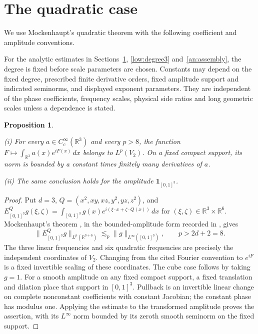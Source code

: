 \documentclass[11pt]{amsart}
\newtheorem{proposition}[theorem]{Proposition}
\theoremstyle{definition}
\theoremstyle{remark}
\newcommand{\R}{\mathbb R}
\numberwithin{equation}{section}
\begin{document}
\section{The quadratic case}\label{root:quadratic}

We use Mockenhaupt's quadratic theorem \cite{Moc96} with the following coefficient and amplitude conventions.

For the analytic estimates in Sections~\ref{root:quadratic}, \ref{low:degree3} and~\ref{an:assembly}, the degree is fixed before scale parameters are chosen. Constants may depend on the fixed degree, prescribed finite derivative orders, fixed amplitude support and indicated seminorms, and displayed exponent parameters. They are independent of the phase coefficients, frequency scales, physical side ratios and long geometric scales unless a dependence is stated.

\begin{proposition}\label{root:quadratic-upper}

\noindent\textup{(i)} For every $a\in C_c^\infty(\R^3)$ and every $p>8$, the function $F\mapsto\int_{\R^3}a(x)e^{iF(x)}\,dx$ belongs to $L^p(V_2)$. On a fixed compact support, its norm is bounded by a constant times finitely many derivatives of $a$.

\noindent\textup{(ii)} The same conclusion holds for the amplitude $\mathbf1_{[0,1]^3}$.
\end{proposition}

\begin{proof}
Put $d=3$, $Q=(x^2,xy,xz,y^2,yz,z^2)$, and $E^Q_{[0,1]^3}g(\xi,\zeta)=\int_{[0,1]^3}g(x)e^{i(\xi\cdot x+\zeta\cdot Q(x))}\,dx$ for $(\xi,\zeta)\in\R^3\times\R^6$. Mockenhaupt's theorem \cite{Moc96}, in the bounded-amplitude form recorded in \cite[Section 1.3]{BGZZK}, gives
\[
\|E^Q_{[0,1]^3}g\|_{L^p(\mathbb R^{3+6})}\lesssim_p \|g\|_{L^\infty([0,1]^3)},\qquad p>2d+2=8.
\]
The three linear frequencies and six quadratic frequencies are precisely the independent coordinates of $V_2$. Changing from the cited Fourier convention to $e^{iF}$ is a fixed invertible scaling of these coordinates. The cube case follows by taking $g=1$. For a smooth amplitude on any fixed compact support, a fixed translation and dilation place that support in $[0,1]^3$. Pullback is an invertible linear change on complete nonconstant coefficients with constant Jacobian; the constant phase has modulus one. Applying the estimate to the transformed amplitude proves the assertion, with its $L^\infty$ norm bounded by its zeroth smooth seminorm on the fixed support.
\end{proof}
\end{document}
